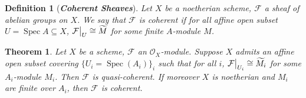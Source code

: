 \documentclass{ctexart}
\newtheorem{definition}{Definition}[section]
\newtheorem{theorem}{Theorem}[section]
\newcommand{\spec}{\operatorname{Spec}}
\begin{document}
\begin{definition}[\textbf{\emph{Coherent Sheaves}}]
    Let $X$ be a noetherian scheme, $\mathcal{F}$ a sheaf of abelian groups on $X$.
    We say that $\mathcal{F}$ is coherent if for all affine open subset $U = \spec A \subseteq X$,
    $\mathcal{F}\big{|}_{U} \cong \widetilde{M}$ for some finite $A$-module $M$.
\end{definition}
\begin{theorem}
    Let $X$ be a scheme, $\mathcal{F}$ an $\mathcal{O}_{X}$-module.
    Suppose $X$ admits an affine open subset covering $\{U_{i} = \spec(A_{i})\}_{i}$ such that for all $i$, $\mathcal{F}\big{|}_{U_{i}} \cong \widetilde{M_{i}}$ for some $A_{i}$-module $M_{i}$.
    Then $\mathcal{F}$ is quasi-coherent.
    If moreover $X$ is noetherian and $M_{i}$ are finite over $A_{i}$, then $\mathcal{F}$ is coherent.
    \label{Theorem 6.1} 
\end{theorem}
\end{document}
